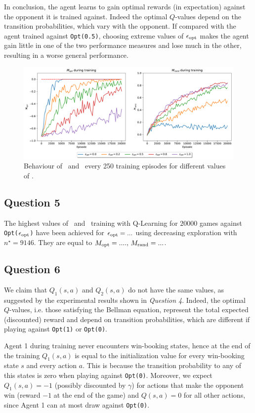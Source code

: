 \documentclass[10pt]{IEEEtran}
\begin{document}
In conclusion, the agent learns to gain optimal rewards (in expectation) against the opponent it is trained against. Indeed the optimal $Q$-values depend on the transition probabilities, which vary with the opponent. If compared with the agent trained against \texttt{Opt(0.5)}, choosing extreme values of $\epsilon_{\text{opt}}$ makes the agent gain little in one of the two performance measures and lose much in the other, resulting in a worse general performance.

\begin{figure}[h]
    \centering
    \includegraphics[width=\linewidth]{code/figures/performance_epsilon_opt.pdf}
    \caption{Behaviour of \mopt\  and \mrand\  every 250 training episodes for different values of \eopt.}
    \label{plot_question4}
\end{figure}

\subsection*{Question 5}
The highest values of \mopt\  and \mrand\  training with Q-Learning for $20000$ games against \texttt{Opt($\epsilon_{\text{opt}}$)} have been achieved for \textcolor{red}{$\epsilon_{\text{opt}} = ...$} using decreasing exploration with $n^{\star} = 9146$. They are equal to \textcolor{red}{$M_{\text{opt}} = ...., \, M_{\text{rand}} = ...$}.

\subsection*{Question 6}
We claim that $Q_1(s,a)$ and $Q_2(s,a)$ do not have the same values, as suggested by the experimental results shown in \emph{Question 4}.
Indeed, the optimal $Q$-values, i.e. those satisfying the Bellman equation, represent the total expected (discounted) reward and depend on transition probabilities, which are different if playing against \texttt{Opt(1)} or \texttt{Opt(0)}. 

Agent 1 during training never encounters win-booking states, hence at the end of the training $Q_1(s,a)$ is equal to the initialization value for every win-booking state $s$ and every action $a$. This is because the transition probability to any of this states is zero when playing against \texttt{Opt(0)}. Moreover, we expect $Q_1(s,a) = -1$ (possibly discounted by $\gamma$) for actions that make the opponent win (reward $-1$ at the end of the game) and $Q(s,a) = 0$ for all other actions, since Agent 1 can at most draw against \texttt{Opt(0)}. 
\end{document}
